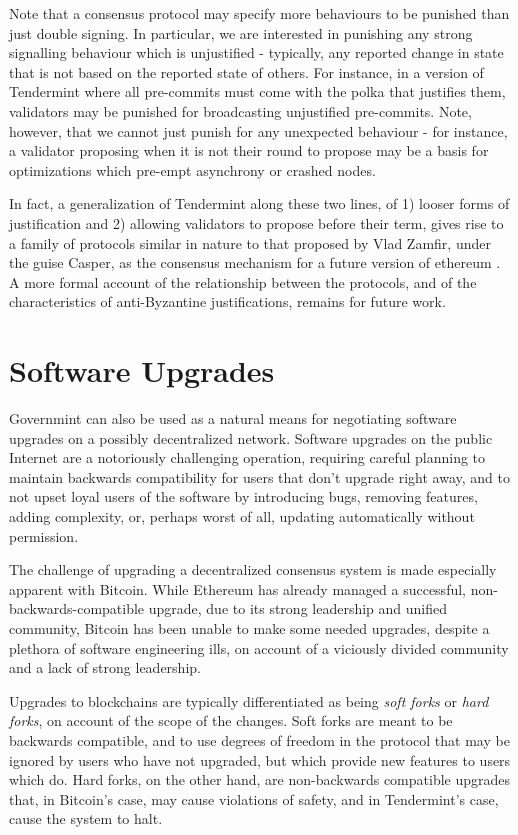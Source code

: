 Note that a consensus protocol may specify more behaviours to be punished than just double signing.
In particular, we are interested in punishing any strong signalling behaviour which is unjustified - typically, any reported change in state that is not based on the reported state of others.
For instance, in a version of Tendermint where all pre-commits 
must come with the polka that justifies them,
validators may be punished for broadcasting unjustified pre-commits.
Note, however, that we cannot just punish for any unexpected behaviour - 
for instance, a validator proposing when it is not their round to propose
may be a basis for optimizations which pre-empt asynchrony or crashed nodes.

In fact, a generalization of Tendermint along these two lines, 
of 1) looser forms of justification and 2) allowing validators to propose before their term,
gives rise to a family of protocols similar in nature to that proposed by Vlad Zamfir,
under the guise Casper, as the consensus mechanism for a future version of ethereum \cite{casper}.
A more formal account of the relationship between the protocols, 
and of the characteristics of anti-Byzantine justifications, remains for future work.

\section{Software Upgrades}

Governmint can also be used as a natural means for negotiating software upgrades on a possibly decentralized network.
Software upgrades on the public Internet are a notoriously challenging operation,
requiring careful planning to maintain backwards compatibility for users that don't upgrade right away,
and to not upset loyal users of the software by introducing bugs, removing features, adding complexity, or,
perhaps worst of all, updating automatically without permission.

The challenge of upgrading a decentralized consensus system is made especially apparent with Bitcoin.
While Ethereum has already managed a successful, non-backwards-compatible upgrade, 
due to its strong leadership and unified community,
Bitcoin has been unable to make some needed upgrades,
despite a plethora of software engineering ills,
on account of a viciously divided community and a lack of strong leadership.

Upgrades to blockchains are typically differentiated as being \emph{soft forks} or \emph{hard forks},
on account of the scope of the changes.
Soft forks are meant to be backwards compatible, and to use degrees of freedom in the protocol that may be ignored
by users who have not upgraded, but which provide new features to users which do.
Hard forks, on the other hand, are non-backwards compatible upgrades that,
in Bitcoin's case, may cause violations of safety, 
and in Tendermint's case, cause the system to halt.

